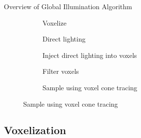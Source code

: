 \documentclass[10pt]{beamer}
\begin{document}
\begin{frame}{Overview of Global Illumination Algorithm}
  \captionsetup[subfigure]{font=footnotesize,labelfont=footnotesize}
  \begin{figure}
    \renewcommand{\thesubfigure}{\arabic{subfigure}}
    \begin{subfigure}[t]{0.32\textwidth}
      \caption{Voxelize}
    \end{subfigure}
    \begin{subfigure}[t]{0.32\textwidth}
      \caption{Direct lighting}
    \end{subfigure}
    \begin{subfigure}[t]{0.32\textwidth}
      \caption{Inject direct lighting into voxels}
    \end{subfigure}

    \begin{subfigure}[t]{0.32\textwidth}
      \caption{Filter voxels}
    \end{subfigure}
    \begin{subfigure}[t]{0.32\textwidth}
      \caption{Sample using voxel cone tracing}
    \end{subfigure}
  \end{figure}
\end{frame}


\subsection{Voxelization}
\end{document}
